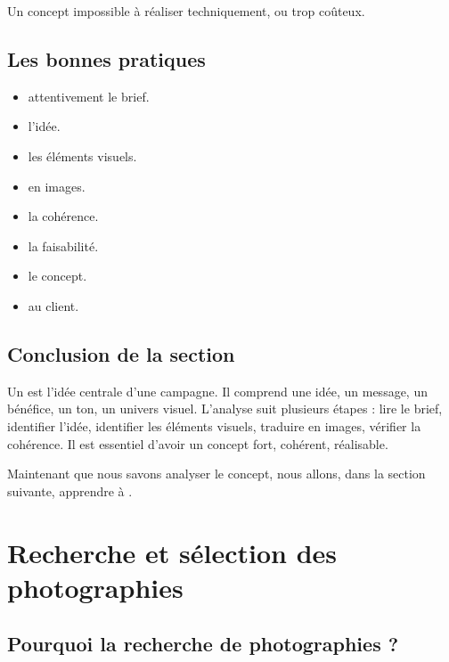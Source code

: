 Un concept impossible à réaliser techniquement, ou trop coûteux.

\subsection{Les bonnes pratiques}

\begin{itemize}
    \item {} attentivement le brief.
    \item {} l'idée.
    \item {} les éléments visuels.
    \item {} en images.
    \item {} la cohérence.
    \item {} la faisabilité.
    \item {} le concept.
    \item {} au client.
\end{itemize}

\subsection*{Conclusion de la section}

Un  est l'idée centrale d'une campagne. Il comprend une idée, un message, un bénéfice, un ton, un univers visuel. L'analyse suit plusieurs étapes : lire le brief, identifier l'idée, identifier les éléments visuels, traduire en images, vérifier la cohérence. Il est essentiel d'avoir un concept fort, cohérent, réalisable.

Maintenant que nous savons analyser le concept, nous allons, dans la section suivante, apprendre à .

\section{Recherche et sélection des photographies}

\subsection{Pourquoi la recherche de photographies ?}

